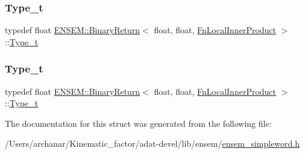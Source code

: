 \mbox{\label{structENSEM_1_1BinaryReturn_3_01float_00_01float_00_01FnLocalInnerProduct_01_4_ad3f2d521df09966c47e84ff9e4dc2a95}} 
\subsubsection{\texorpdfstring{Type\_t}{Type\_t}\hspace{0.1cm}{\footnotesize\ttfamily [2/3]}}
{\footnotesize\ttfamily typedef float \mbox{\hyperlink{structENSEM_1_1BinaryReturn}{E\+N\+S\+E\+M\+::\+Binary\+Return}}$<$ float, float, \mbox{\hyperlink{structENSEM_1_1FnLocalInnerProduct}{Fn\+Local\+Inner\+Product}} $>$\+::\mbox{\hyperlink{structENSEM_1_1BinaryReturn_3_01float_00_01float_00_01FnLocalInnerProduct_01_4_ad3f2d521df09966c47e84ff9e4dc2a95}{Type\+\_\+t}}}

\mbox{\label{structENSEM_1_1BinaryReturn_3_01float_00_01float_00_01FnLocalInnerProduct_01_4_ad3f2d521df09966c47e84ff9e4dc2a95}} 
\subsubsection{\texorpdfstring{Type\_t}{Type\_t}\hspace{0.1cm}{\footnotesize\ttfamily [3/3]}}
{\footnotesize\ttfamily typedef float \mbox{\hyperlink{structENSEM_1_1BinaryReturn}{E\+N\+S\+E\+M\+::\+Binary\+Return}}$<$ float, float, \mbox{\hyperlink{structENSEM_1_1FnLocalInnerProduct}{Fn\+Local\+Inner\+Product}} $>$\+::\mbox{\hyperlink{structENSEM_1_1BinaryReturn_3_01float_00_01float_00_01FnLocalInnerProduct_01_4_ad3f2d521df09966c47e84ff9e4dc2a95}{Type\+\_\+t}}}



The documentation for this struct was generated from the following file\+:\begin{DoxyCompactItemize}
\item 
/\+Users/archanar/\+Kinematic\+\_\+factor/adat-\/devel/lib/ensem/\mbox{\hyperlink{adat-devel_2lib_2ensem_2ensem__simpleword_8h}{ensem\+\_\+simpleword.\+h}}\end{DoxyCompactItemize}

